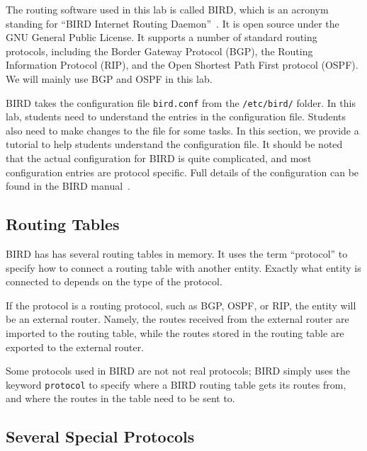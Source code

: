 The routing software used in this lab is called BIRD, which is 
an acronym standing for ``BIRD Internet Routing Daemon''~\cite{bird}.
It is open source under the GNU General Public License. It 
supports a number of standard routing protocols, including 
the Border Gateway Protocol (BGP),
the Routing Information Protocol (RIP),
and the Open Shortest Path First protocol (OSPF). We will
mainly use BGP and OSPF in this lab. 


BIRD takes the configuration
file \texttt{bird.conf} from the \texttt{/etc/bird/} folder.
In this lab, students need to understand the entries in the 
configuration file. Students also need to make changes
to the file for some tasks. In this section, we provide 
a tutorial to help students understand the 
configuration file. It should be noted that the actual configuration
for BIRD is quite complicated, and most configuration entries 
are protocol specific. Full details of the configuration 
can be found in the BIRD manual~\cite{birdmanual}.



\subsection{Routing Tables} 


BIRD has has several routing tables in memory. It uses
the term ``protocol'' to specify how 
to connect a routing table with another entity. Exactly
what entity is connected to depends on the type of the protocol.

If the protocol is a routing protocol, 
such as BGP, OSPF, or RIP, the entity will be an external router.
Namely, the routes received from the external router
are imported to the routing table, while 
the routes stored in the routing table are exported 
to the external router.

Some protocols used in BIRD are not not real protocols; 
BIRD simply uses the keyword \texttt{protocol} to specify where
a BIRD routing table gets its routes from, and where the routes
in the table need to be sent to.

\subsection{Several Special Protocols} 

